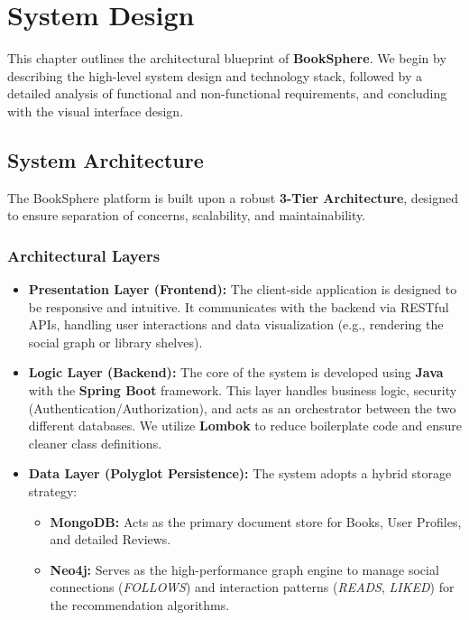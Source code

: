 \chapter{System Design}
\label{chap:system_design}

This chapter outlines the architectural blueprint of \textbf{BookSphere}. We begin by describing the high-level system design and technology stack, followed by a detailed analysis of functional and non-functional requirements, and concluding with the visual interface design.

\section{System Architecture}
The BookSphere platform is built upon a robust \textbf{3-Tier Architecture}, designed to ensure separation of concerns, scalability, and maintainability.

\subsection{Architectural Layers}
\begin{itemize}
    \item \textbf{Presentation Layer (Frontend):} The client-side application is designed to be responsive and intuitive. It communicates with the backend via RESTful APIs, handling user interactions and data visualization (e.g., rendering the social graph or library shelves).
    
    \item \textbf{Logic Layer (Backend):} The core of the system is developed using \textbf{Java} with the \textbf{Spring Boot} framework. This layer handles business logic, security (Authentication/Authorization), and acts as an orchestrator between the two different databases. We utilize \textbf{Lombok} to reduce boilerplate code and ensure cleaner class definitions.
    
    \item \textbf{Data Layer (Polyglot Persistence):} The system adopts a hybrid storage strategy:
    \begin{itemize}
        \item \textbf{MongoDB:} Acts as the primary document store for Books, User Profiles, and detailed Reviews.
        \item \textbf{Neo4j:} Serves as the high-performance graph engine to manage social connections (\textit{FOLLOWS}) and interaction patterns (\textit{READS}, \textit{LIKED}) for the recommendation algorithms.
    \end{itemize}
\end{itemize}


